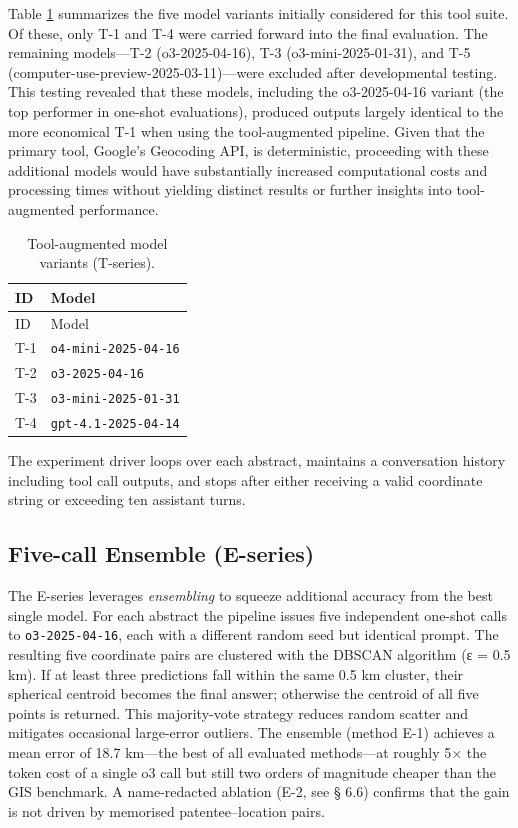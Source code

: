 Table \ref{tbl:tmodels} summarizes the five model variants initially
considered for this tool suite. Of these, only T-1 and T-4 were carried
forward into the final evaluation. The remaining models---T-2
(o3-2025-04-16), T-3 (o3-mini-2025-01-31), and T-5
(computer-use-preview-2025-03-11)---were excluded after developmental
testing. This testing revealed that these models, including the
o3-2025-04-16 variant (the top performer in one-shot evaluations),
produced outputs largely identical to the more economical T-1 when using
the tool-augmented pipeline. Given that the primary tool, Google's
Geocoding API, is deterministic, proceeding with these additional models
would have substantially increased computational costs and processing
times without yielding distinct results or further insights into
tool-augmented performance.

\begin{longtable}[]{@{}ll@{}}
\caption{\label{tbl:tmodels}Tool-augmented model variants
(T-series).}\tabularnewline
\toprule\noalign{}
ID & Model \\
\midrule\noalign{}
\endfirsthead
\toprule\noalign{}
ID & Model \\
\midrule\noalign{}
\endhead
\bottomrule\noalign{}
\endlastfoot
T-1 & \passthrough{\lstinline!o4-mini-2025-04-16!} \\
T-2 & \passthrough{\lstinline!o3-2025-04-16!} \\
T-3 & \passthrough{\lstinline!o3-mini-2025-01-31!} \\
T-4 & \passthrough{\lstinline!gpt-4.1-2025-04-14!} \\
\end{longtable}

The experiment driver loops over each abstract, maintains a conversation
history including tool call outputs, and stops after either receiving a
valid coordinate string or exceeding ten assistant turns.

\subsection{Five-call Ensemble
(E-series)}\label{five-call-ensemble-e-series}

The E-series leverages \emph{ensembling} to squeeze additional accuracy
from the best single model. For each abstract the pipeline issues five
independent one-shot calls to \passthrough{\lstinline!o3-2025-04-16!},
each with a different random seed but identical prompt. The resulting
five coordinate pairs are clustered with the DBSCAN algorithm (ε = 0.5
km). If at least three predictions fall within the same 0.5 km cluster,
their spherical centroid becomes the final answer; otherwise the
centroid of all five points is returned. This majority-vote strategy
reduces random scatter and mitigates occasional large-error outliers.
The ensemble (method E-1) achieves a mean error of 18.7 km---the best of
all evaluated methods---at roughly 5× the token cost of a single o3 call
but still two orders of magnitude cheaper than the GIS benchmark. A
name-redacted ablation (E-2, see § 6.6) confirms that the gain is not
driven by memorised patentee--location pairs.

